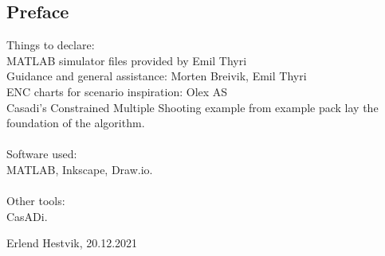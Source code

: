 \newpage
\begin{centering}
\section*{Preface}
Things to declare:\hfill\\
MATLAB simulator files provided by Emil Thyri\\
Guidance and general assistance: Morten Breivik, Emil Thyri\\
ENC charts for scenario inspiration: Olex AS\\
Casadi's Constrained Multiple Shooting example from example pack lay the foundation of the algorithm.\\
\hfill\\
Software used:\\
MATLAB, Inkscape, Draw.io.\\
\hfill\\
Other tools:\\
CasADi.


\end{centering}
\begin{center}
    Erlend Hestvik, 20.12.2021
\end{center}

\afterpage{\blankpage}